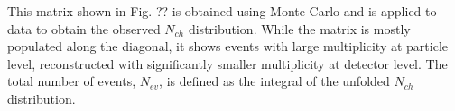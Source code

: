 This matrix shown in Fig. ?? is obtained using Monte Carlo and is applied to data to obtain the observed $N_{ch}$ distribution. While the matrix is mostly populated along the diagonal, it shows events with large multiplicity at particle
level, reconstructed with significantly smaller multiplicity at detector level. The total number of events, $N_{ev}$, is defined as the integral of the unfolded $N_{ch}$ distribution.